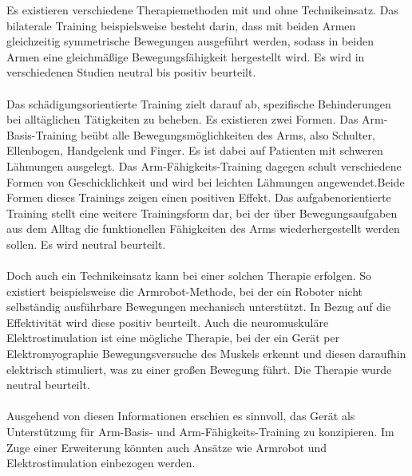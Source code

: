 Es existieren verschiedene Therapiemethoden mit und ohne Technikeinsatz.
Das bilaterale Training beispielsweise besteht darin, dass mit beiden Armen gleichzeitig symmetrische Bewegungen ausgeführt werden, sodass in beiden Armen eine gleichmäßige Bewegungsfähigkeit hergestellt wird. Es wird in verschiedenen Studien neutral bis positiv beurteilt.\cite{Src:DGNeurorehab} \\ \\
Das schädigungsorientierte Training zielt darauf ab, spezifische Behinderungen bei alltäglichen Tätigkeiten zu beheben. Es existieren zwei Formen. Das Arm-Basis-Training beübt alle Bewegungsmöglichkeiten des Arms, also Schulter, Ellenbogen, Handgelenk und Finger. Es ist dabei auf Patienten mit schweren Lähmungen ausgelegt.\cite{Src:DGNeurorehab} Das Arm-Fähigkeits-Training dagegen schult verschiedene Formen von Geschicklichkeit und wird bei leichten Lähmungen angewendet.\cite{Src:DGNeurorehab}Beide Formen dieses Trainings zeigen einen positiven Effekt.\cite{Src:RehabNelles} Das aufgabenorientierte Training stellt eine weitere Trainingsform dar, bei der über Bewegungsaufgaben aus dem Alltag die funktionellen Fähigkeiten des Arms wiederhergestellt werden sollen. Es wird neutral beurteilt.\cite{Src:DGNeurorehab}\\ \\
Doch auch ein Technikeinsatz kann bei einer solchen Therapie erfolgen. So existiert beispielsweise die Armrobot-Methode, bei der ein Roboter nicht selbständig ausführbare Bewegungen mechanisch unterstützt. In Bezug auf die Effektivität wird diese positiv beurteilt.\cite{Src:DGNeurorehab} Auch die neuromuskuläre Elektrostimulation ist eine mögliche Therapie, bei der ein Gerät per Elektromyographie Bewegungsversuche des Muskels erkennt und diesen daraufhin elektrisch stimuliert, was zu einer großen Bewegung führt.\cite{Src:DGNeurorehab} Die Therapie wurde neutral beurteilt.\cite{Src:RehabNelles} \\ \\
Ausgehend von diesen Informationen erschien es sinnvoll, das Gerät als Unterstützung für Arm-Basis- und Arm-Fähigkeits-Training zu konzipieren. Im Zuge einer Erweiterung könnten auch Ansätze wie Armrobot und Elektrostimulation einbezogen werden.